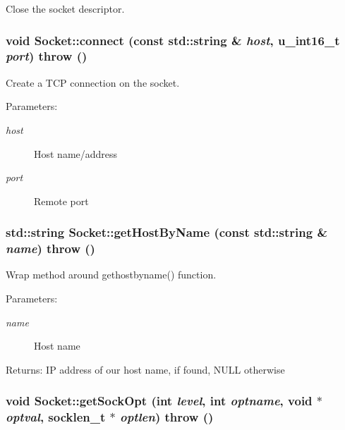 Close the socket descriptor. 

\hypertarget{classSocket_6aea9340963adc8f277d1bbf28175954}{
\subsubsection[{connect}]{\setlength{\rightskip}{0pt plus 5cm}void Socket::connect (const std::string \& {\em host}, \/  u\_\-int16\_\-t {\em port})  throw ()}}
\label{classSocket_6aea9340963adc8f277d1bbf28175954}


Create a TCP connection on the socket. 

\begin{Desc}
\item[Parameters:]
\begin{description}
\item[{\em host}]Host name/address \item[{\em port}]Remote port \end{description}
\end{Desc}
\hypertarget{classSocket_a87721ea6aaa95397bca49ed7c45b897}{
\subsubsection[{getHostByName}]{\setlength{\rightskip}{0pt plus 5cm}std::string Socket::getHostByName (const std::string \& {\em name})  throw ()}}
\label{classSocket_a87721ea6aaa95397bca49ed7c45b897}


Wrap method around gethostbyname() function. 

\begin{Desc}
\item[Parameters:]
\begin{description}
\item[{\em name}]Host name \end{description}
\end{Desc}
\begin{Desc}
\item[Returns:]IP address of our host name, if found, NULL otherwise \end{Desc}
\hypertarget{classSocket_25b831123a5914c6203c72cb8a48026b}{
\subsubsection[{getSockOpt}]{\setlength{\rightskip}{0pt plus 5cm}void Socket::getSockOpt (int {\em level}, \/  int {\em optname}, \/  void $\ast$ {\em optval}, \/  socklen\_\-t $\ast$ {\em optlen})  throw ()}}
\label{classSocket_25b831123a5914c6203c72cb8a48026b}


